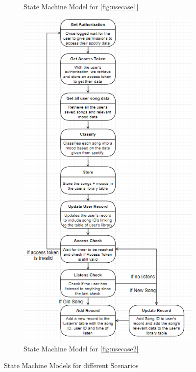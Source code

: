 \documentclass[10pt, notitlepage]{report}
\begin{document}
\begin{figure}[h]
{\begin{subfigure}{0.5\textwidth}
	\caption{State Machine Model for \ref{fig:usecase1}}
	\label{fig:statemach1}
\end{subfigure}%
\begin{subfigure}{0.5\textwidth}
	\centering	
	\includegraphics[width=1.2\linewidth]{statemach2.png}
	\caption{State Machine Model for \ref{fig:usecase2}}
	\label{fig:statemach2}
\end{subfigure}
}

\caption{State Machine Models for different Scenarios}
\label{fig:statemach}

\end{figure}
\end{document}
